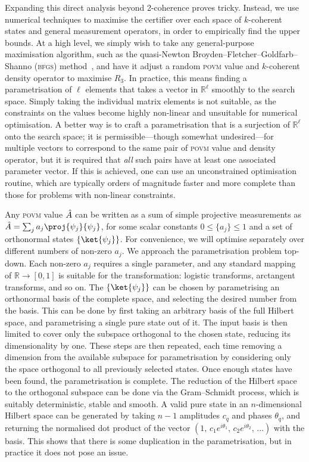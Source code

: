 Expanding this direct analysis beyond 2-coherence proves tricky.
Instead, we use numerical techniques to maximise the certifier over each space of $k$-coherent states and general measurement operators, in order to empirically find the upper bounds.
At a high level, we simply wish to take any general-purpose maximisation algorithm, such as the quasi-Newton Broyden--Fletcher--Goldfarb--Shanno (\textsc{bfgs}) method~\cite{Press2007}, and have it adjust a random \textsc{povm} value and $k$-coherent density operator to maximise $R_3$.
In practice, this means finding a parametrisation of $\ell$ elements that takes a vector in $\mathbb R^\ell$ smoothly to the search space.
Simply taking the individual matrix elements is not suitable, as the constraints on the values become highly non-linear and unsuitable for numerical optimisation.
A better way is to craft a parametrisation that is a surjection of $\mathbb R^\ell$ onto the search space; it is permissible---though somewhat undesired---for multiple vectors to correspond to the same pair of \textsc{povm} value and density operator, but it is required that \emph{all} such pairs have at least one associated parameter vector.
If this is achieved, one can use an unconstrained optimisation routine, which are typically orders of magnitude faster and more complete than those for problems with non-linear constraints.

Any \textsc{povm} value $\hat{A}$ can be written as a sum of simple projective measurements as $\op A = \sum_j a_j \proj{\psi_j}{\psi_j}$, for some scalar constants $0\le \{a_j\} \le1$ and a set of orthonormal states $\{\ket{\psi_j}\}$.
For convenience, we will optimise separately over different numbers of non-zero $a_j$.
We approach the parametrisation problem top-down.
Each non-zero $a_j$ requires a single parameter, and any standard mapping of $\mathbb R\to[0,1]$ is suitable for the transformation: logistic transforms, arctangent transforms, and so on.
The $\{\ket{\psi_j}\}$ can be chosen by parametrising an orthonormal basis of the complete space, and selecting the desired number from the basis.
This can be done by first taking an arbitrary basis of the full Hilbert space, and parametrising a single pure state out of it.
The input basis is then limited to cover only the subspace orthogonal to the chosen state, reducing its dimensionality by one.
These steps are then repeated, each time removing a dimension from the available subspace for parametrisation by considering only the space orthogonal to all previously selected states.
Once enough states have been found, the parametrisation is complete.
The reduction of the Hilbert space to the orthogonal subspace can be done via the Gram--Schmidt process, which is suitably deterministic, stable and smooth.
A valid pure state in an $n$-dimensional Hilbert space can be generated by taking $n-1$ amplitudes $c_q$ and phases $\theta_q$, and returning the normalised dot product of the vector $(1,\,c_1e^{i\theta_1},\,c_2 e^{i\theta_2},\,\dotsc)$ with the basis.
This shows that there is some duplication in the parametrisation, but in practice it does not pose an issue.

